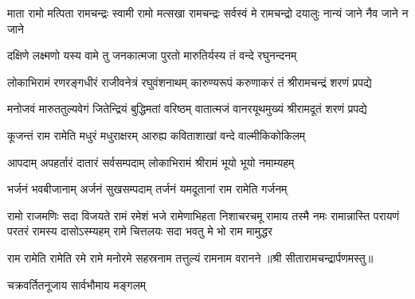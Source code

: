\fourlineindentedshloka
{माता रामो मत्पिता रामचन्द्रः}
{स्वामी रामो मत्सखा रामचन्द्रः}
{सर्वस्वं मे रामचन्द्रो दयालुः}
{नान्यं जाने नैव जाने न जाने}

\twolineshloka
{दक्षिणे लक्ष्मणो यस्य वामे तु जनकात्मजा}
{पुरतो मारुतिर्यस्य तं वन्दे रघुनन्दनम्}

\twolineshloka
{लोकाभिरामं रणरङ्गधीरं राजीवनेत्रं रघुवंशनाथम्}
{कारुण्यरूपं करुणाकरं तं श्रीरामचन्द्रं शरणं प्रपद्ये}

\twolineshloka
{मनोजवं मारुततुल्यवेगं जितेन्द्रियं बुद्धिमतां वरिष्ठम्}
{वातात्मजं वानरयूथमुख्यं श्रीरामदूतं शरणं प्रपद्ये}

\twolineshloka
{कूजन्तं राम रामेति मधुरं मधुराक्षरम्}
{आरुह्य कविताशाखां वन्दे वाल्मीकिकोकिलम्}

\twolineshloka
{आपदाम् अपहर्तारं दातारं सर्वसम्पदाम्}
{लोकाभिरामं श्रीरामं भूयो भूयो नमाम्यहम्}

\twolineshloka
{भर्जनं भवबीजानाम् अर्जनं सुखसम्पदाम्}
{तर्जनं यमदूतानां राम रामेति गर्जनम्}

\fourlineindentedshloka
{रामो राजमणिः सदा विजयते रामं रमेशं भजे}
{रामेणाभिहता निशाचरचमू रामाय तस्मै नमः}
{रामान्नास्ति परायणं परतरं रामस्य दासोऽस्म्यहम्}
{रामे चित्तलयः सदा भवतु मे भो राम मामुद्धर}

\twolineshloka
{राम रामेति रामेति रमे रामे मनोरमे}
{सहस्रनाम तत्तुल्यं रामनाम वरानने}
॥श्री सीतारामचन्द्रार्पणमस्तु॥

\closesection
{}
{चक्रवर्तितनूजाय सार्वभौमाय मङ्गलम्}